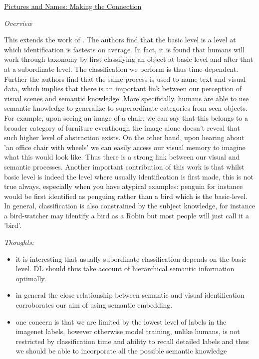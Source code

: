 \documentclass{report}
\begin{document}
\underline{Pictures and Names: Making the Connection \cite{Joliceur1984}}

\textit{Overview}

This extends the work of \cite{Rosch1976}. The authors find that the basic level is a level at which identification is fastests on average. In fact, it is found that humans will work through taxonomy by first classifying an object at basic level and after that at a subordinate level. The classification we perform is thus time-dependent. Further the authors find that the same process is used to name text and visual data, which implies that there is an important link between our perception of visual scenes and semantic knowledge. More specifically, humans are able to use semantic knowledge to generalize to superordinate categories from seen objects. For example, upon seeing an image of a chair, we can say that this belongs to a broader category of furniture eventhough the image alone doesn't reveal that such higher level of abstraction exists. On the other hand, upon hearing about 'an office chair with wheels' we can easily access our visual memory to imagine what this would look like. Thus there is a strong link between our visual and semantic processes. Another important contribution of this work is that whilst basic level is indeed the level where usually identification is first made, this is not true always, especially when you have atypical examples: penguin for instance would be first identified as penguing rather than a bird which is the basic-level. In general, classification is also constrained by the subject knowledge, for instance a bird-watcher may identify a bird as a Robin but most people will just call it a 'bird'. 

\textit{Thoughts:}
\begin{itemize}
  \item it is interesting that usually subordinate classification depends on the basic level. DL should thus take account of hierarchical semantic information optimally.
  \item in general the close relationship between semantic and visual identification corroborates our aim of using semantic embedding. 
  \item one concern is that we are limited by the lowest level of labels in the imagenet labels, however otherwise model training, unlike humans, is not restricted by classification time and ability to recall detailed labels and thus we should be able to incorporate all the possible semantic knowledge \\
\end{itemize}
\end{document}

